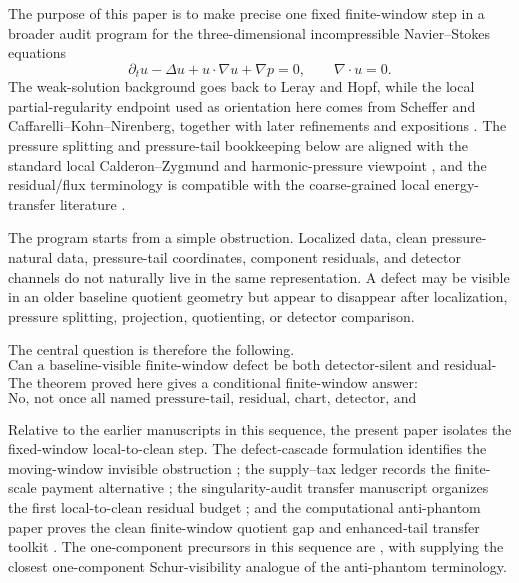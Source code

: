 \documentclass[11pt]{article}
\numberwithin{equation}{section}
\theoremstyle{definition}
\theoremstyle{remark}
\begin{document}
The purpose of this paper is to make precise one fixed finite-window step in a broader audit program for the three-dimensional incompressible Navier--Stokes equations \cite{YuSchur2026,YuInvisible2026,YuCriticalLedgers2026,YuSingularityAuditTransfer2026,YuComputationalAntiPhantom2026}
\[
        \partial_t u-\Delta u+u\cdot\nabla u+\nabla p=0,
        \qquad \nabla\cdot u=0.
\]
The weak-solution background goes back to Leray and Hopf, while the local partial-regularity endpoint used as orientation here comes from Scheffer and Caffarelli--Kohn--Nirenberg, together with later refinements and expositions \cite{Leray1934,Hopf1951,Scheffer1976,Scheffer1977,CKN1982,Lin1998,SereginLectureNotes}.  The pressure splitting and pressure-tail bookkeeping below are aligned with the standard local Calderon--Zygmund and harmonic-pressure viewpoint \cite{SohrWahl1986,SereginSverak2002,SereginLectureNotes}, and the residual/flux terminology is compatible with the coarse-grained local energy-transfer literature \cite{ConstantinETiti1994,Eyink1994,DuchonRobert2000}.

The program starts from a simple obstruction.  Localized data, clean pressure-natural data, pressure-tail coordinates, component residuals, and detector channels do not naturally live in the same representation.  A defect may be visible in an older baseline quotient geometry but appear to disappear after localization, pressure splitting, projection, quotienting, or detector comparison.

The central question is therefore the following.
\[
\boxed{\text{Can a baseline-visible finite-window defect be both detector-silent and residual-cheap?}}
\]
The theorem proved here gives a conditional finite-window answer:
\[
\boxed{\text{No, not once all named pressure-tail, residual, chart, detector, and synchronization costs are paid.}}
\]

Relative to the earlier manuscripts in this sequence, the present paper isolates the fixed-window local-to-clean step.  The defect-cascade formulation identifies the moving-window invisible obstruction \cite{YuInvisible2026}; the supply--tax ledger records the finite-scale payment alternative \cite{YuCriticalLedgers2026}; the singularity-audit transfer manuscript organizes the first local-to-clean residual budget \cite{YuSingularityAuditTransfer2026}; and the computational anti-phantom paper proves the clean finite-window quotient gap and enhanced-tail transfer toolkit \cite{YuComputationalAntiPhantom2026}.  The one-component precursors in this sequence are \cite{YuOneComponent2026,YuStrict2026,YuSchur2026}, with \cite{YuSchur2026} supplying the closest one-component Schur-visibility analogue of the anti-phantom terminology.
\end{document}
